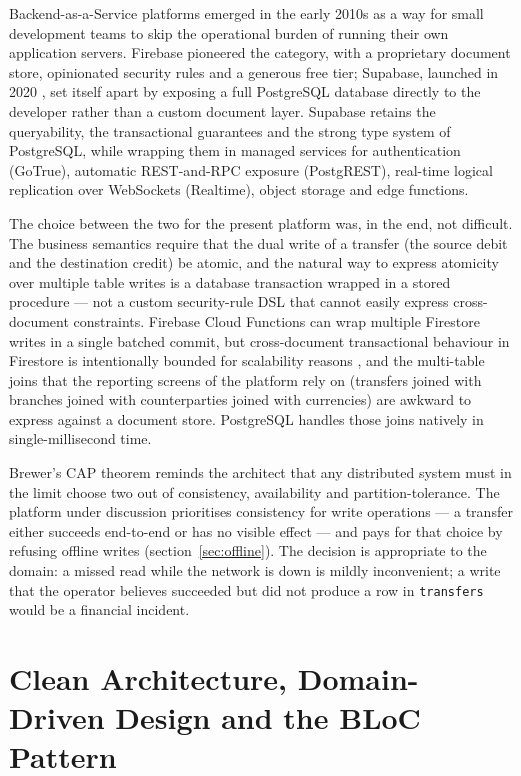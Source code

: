 Backend-as-a-Service platforms emerged in the early 2010s as a way for small development teams to skip the operational burden of running their own application servers. Firebase pioneered the category, with a proprietary document store, opinionated security rules and a generous free tier; Supabase, launched in 2020 \cite{copplestone2024}, set itself apart by exposing a full PostgreSQL database directly to the developer rather than a custom document layer. Supabase retains the queryability, the transactional guarantees and the strong type system of PostgreSQL, while wrapping them in managed services for authentication (GoTrue), automatic REST-and-RPC exposure (PostgREST), real-time logical replication over WebSockets (Realtime), object storage and edge functions.

The choice between the two for the present platform was, in the end, not difficult. The business semantics require that the dual write of a transfer (the source debit and the destination credit) be atomic, and the natural way to express atomicity over multiple table writes is a database transaction wrapped in a stored procedure --- not a custom security-rule DSL that cannot easily express cross-document constraints. Firebase Cloud Functions can wrap multiple Firestore writes in a single batched commit, but cross-document transactional behaviour in Firestore is intentionally bounded for scalability reasons \cite{firebase2024}, and the multi-table joins that the reporting screens of the platform rely on (transfers joined with branches joined with counterparties joined with currencies) are awkward to express against a document store. PostgreSQL handles those joins natively in single-millisecond time.

Brewer's CAP theorem \cite{brewer2000} reminds the architect that any distributed system must in the limit choose two out of consistency, availability and partition-tolerance. The platform under discussion prioritises consistency for write operations --- a transfer either succeeds end-to-end or has no visible effect --- and pays for that choice by refusing offline writes (section~\ref{sec:offline}). The decision is appropriate to the domain: a missed read while the network is down is mildly inconvenient; a write that the operator believes succeeded but did not produce a row in \texttt{transfers} would be a financial incident.

\section{Clean Architecture, Domain-Driven Design and the BLoC Pattern}
\label{sec:cleanarch}

